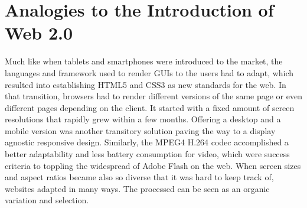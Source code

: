\section{Analogies to the Introduction of Web 2.0}

%
%


Much like when tablets and smartphones were introduced to the market, the languages and framework used to render GUIs to the users had to adapt, which resulted into establishing HTML5 and CSS3 as new standards for the web. In that transition, %
browsers had to render different versions of the same page or even different pages depending on the client. It started with a fixed amount of screen resolutions that rapidly grew within a few months. Offering a desktop and a mobile version was another transitory solution paving the way to %
a display agnostic responsive design. Similarly, the MPEG4 H.264 codec accomplished a better adaptability and less battery consumption for video, which were success criteria to toppling the widespread of Adobe Flash on the web. %
When screen sizes and aspect ratios became also so diverse that it was hard to keep track of, websites %
adapted in many ways. %
The processed can be seen as an organic variation and selection.

